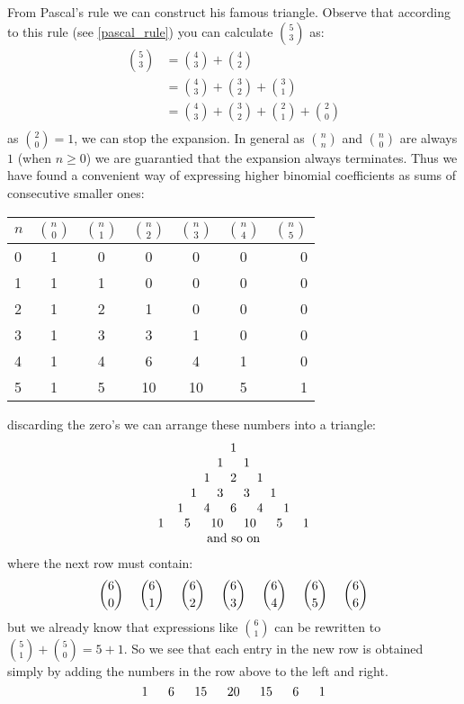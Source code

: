 \myindent From Pascal's rule we can construct his famous triangle. Observe that according to this rule (see \ref{pascal_rule}) you can calculate $\binom{5}{3}$ as:
\begin{align*}
 \binom{5}{3}
& =  \binom{4}{3} + \binom{4}{2}  \\
& =  \binom{4}{3} + \binom{3}{2} +  \binom{3}{1} \\
& =  \binom{4}{3} + \binom{3}{2} +  \binom{2}{1} + \binom{2}{0} \\
\end{align*}
as $\binom{2}{0} = 1$, we can stop the expansion. In general as $\binom{n}{n}$ and $\binom{n}{0}$ are always $1$ (when $n \geq 0$) we are guarantied that the expansion always terminates. Thus we have found a convenient way of expressing higher binomial coefficients as sums of consecutive smaller ones:
\begin{center}
\begin{tabular}{l|*{5}{c}r}
\toprule
$n$ & $\binom{n}{0}$        & $\binom{n}{1}$ & $\binom{n}{2}$ & $\binom{n}{3}$ & $\binom{n}{4}$  & $\binom{n}{5}$ \\
\hline
0		& 1                     & 0 			       & 0 			        & 0 			       & 0 			         & 0   \\
1   & 1                     & 1 			       & 0 			        & 0 			       & 0  			       & 0   \\
2   & 1                     & 2 			       & 1 			        & 0 			       & 0  			       & 0   \\
3		& 1                     & 3 			       & 3 			        & 1			         & 0  			       & 0   \\
4		& 1                     & 4 			       & 6 			        & 4			         & 1  			       & 0   \\
5		& 1                     & 5 			       & 10 			      & 10			       & 5  			       & 1   \\
\bottomrule
\end{tabular}
\end{center}
discarding the zero's we can arrange these numbers into a triangle:
\[
\begin{array}{c}
1 \\
1\ \hspace{0.45cm} 1\\
1\ \hspace{0.45cm} 2\ \hspace{0.45cm} 1   \\
1\ \hspace{0.45cm} 3\ \hspace{0.45cm} 3\   \hspace{0.45cm} 1   \\
1\ \hspace{0.45cm} 4\ \hspace{0.45cm} 6\   \hspace{0.45cm} 4\   \hspace{0.45cm} 1\\
1\ \hspace{0.45cm} 5\ \hspace{0.45cm} 10\ \hspace{0.45cm} 10\ \hspace{0.45cm} 5\ \hspace{0.45cm}1\\
\ \textnormal{and so on} \ \\
\end{array}
\]
where the next row must contain:
\[
\binom{6}{0} \hspace{0.45cm} \binom{6}{1} \hspace{0.45cm} \binom{6}{2} \hspace{0.45cm} \binom{6}{3} \hspace{0.45cm} \binom{6}{4} \hspace{0.45cm} \binom{6}{5} \hspace{0.45cm} \binom{6}{6}
\]
but we already know that expressions like $\binom{6}{1}$ can be rewritten to
$\binom{5}{1} + \binom{5}{0} = 5 + 1$. So we see that each entry in the new row
is obtained simply by adding the numbers in the row above to the left and right.
\[
1\ \myindent 6\ \myindent 15\ \myindent 20\ \myindent 15\ \myindent 6\ \myindent 1
\]

